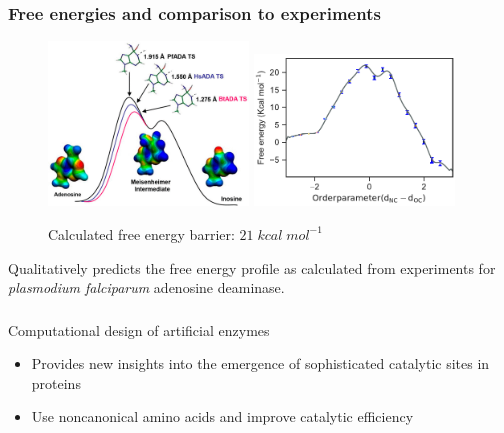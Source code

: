 \documentclass{beamer}
\begin{document}
\begin{frame}
\frametitle{Free energies and comparison to experiments}
\begin{figure}
   \includegraphics[width=0.475\textwidth]{figures/ada-exp.png}
   \hfill
   \includegraphics[width=0.475\textwidth]{figures/ada-fenergy.pdf}
\caption{Calculated free energy barrier: $21\;kcal\;mol^{-1}$}
\end{figure}
Qualitatively predicts the free energy profile as calculated from experiments for \textit{plasmodium falciparum}
adenosine deaminase.
\end{frame}
\begin{frame}
\frametitle{}
\begin{block}{\centering Computational design of artificial enzymes}
\pause
\begin{itemize}[<+-|alert@+>]
        \item Provides new insights into the emergence of sophisticated catalytic sites in proteins
        \item Use noncanonical amino acids and improve catalytic efficiency
    \end{itemize} 
\end{block}
\end{frame}
\end{document}

